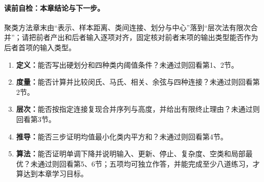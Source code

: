 \paragraph{读前自检：本章结论与下一步。}聚类方法章末由“表示、样本距离、类间连接、划分与中心”落到“层次法有限次合并”；请把前者产出和后者输入逐项对齐，固定核对前者末项的输出类型能否作为后者首项的输入类型。\par

\begin{SLCompactClosure}
\label{struct:V4-C02-CH36}

\label{struct:V4-C02-CH37}
\begin{selfcheckbox}
\begin{enumerate}[leftmargin=2.2em]
  \item \textbf{定义：}能否写出硬划分和四种类内阈值条件？未通过则回看第1、2节。
  \item \textbf{度量：}能否计算并比较闵氏、马氏、相关、余弦与四种连接？未通过则回看第2节。
  \item \textbf{层次：}能否按指定连接复现合并序列与高度，并给出有限终止理由？未通过则回看第3节。
  \item \textbf{推导：}能否三步证明均值最小化类内平方和？未通过则回看第4节。
  \item \textbf{算法：}能否证明单调下降并说明输入、更新、停止、复杂度、空类和局部最优？未通过则回看第5、6节；五项均可独立作答，并能完成至少八道练习，才算达到本章学习目标。
\end{enumerate}
\end{selfcheckbox}
\end{SLCompactClosure}
